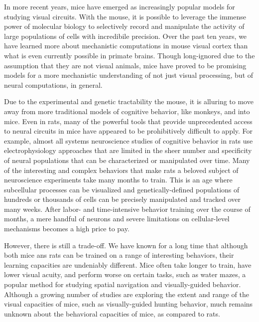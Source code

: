 In more recent years, mice have emerged as increasingly popular models for studying visual circuits. With the mouse, it is possible to leverage the immense power of molecular biology to selectively record and manipulate the activity of large populations of cells with incredibile precision. Over the past ten years, we have learned more about mechanistic computations in mouse visual cortex than what is even currently possible in primate brains. Though long-ignored due to the assumption that they are not visual animals, mice have proved to be promising models for a more mechanistic understanding of not just visual processing, but of neural computations, in general. 

Due to the experimental and genetic tractability the mouse, it is alluring to move away from more traditional models of cognitive behavior, like monkeys, and into mice. Even in rats, many of the powerful tools that provide unprecedented access to neural circuits in mice have appeared to be prohibitively difficult to apply. For example, almost all systems neuroscience studies of cognitive behavior in rats use electrophysiology approaches that are limited in the sheer number and specificity of neural populations that can be characterized or manipulated over time. Many of the interesting and complex behaviors that make rats a beloved subject of neuroscience experiments take many months to train. This is an age where subcellular processes can be visualized and genetically-defined populations of hundreds or thousands of cells can be precisely manipulated and tracked over many weeks. After labor- and time-intensive behavior training over the course of months, a mere handful of neurons and severe limitations on cellular-level mechanisms becomes a high price to pay. 

However, there is still a trade-off. We have known for a long time that although both mice ans rats can be trained on a range of interesting behaviors, their learning capacities are undeniably different. Mice often take longer to train, have lower visual acuity, and perform worse on certain tasks, such as water mazes, a popular method for studying spatial navigation and visually-guided behavior\cite{Prusky2000, Jaramillo2014, Whishaw1995, Whishaw1996}. Although a growing number of studies are exploring the extent and range of the visual capacities of mice, such as visually-guided hunting behavior\cite{Hoy2016, Meyer2020, Michaiel2020}, much remains unknown about the behavioral capacities of mice, as compared to rats.  

